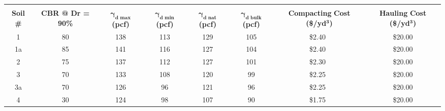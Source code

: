 \documentclass{article}
\begin{document}
\begin{center}
    \begin{tabular}{|c|c|c|c|c|c|c|c|}
        \hline
        &&&&&&&\\
        \textbf{Soil \#} & \textbf{CBR @ Dr = 90\%} &\shortstack[c]{\textbf{$\bm{\gamma_{d\text{ max}}}$}\\\textbf{(pcf)}} & \shortstack[c]{\textbf{$\bm{\gamma_{d\text{ min}}}$}\\\textbf{(pcf)}} & \shortstack[c]{\textbf{$\bm{\gamma_{d\text{ nat}}}$}\\\textbf{(pcf)}} & \shortstack[c]{\textbf{$\bm{\gamma_{d\text{ bulk}}}$}\\\textbf{(pcf)}} & \shortstack[c]{\textbf{Compacting}\\\textbf{Cost (\$/yd$\bm{^3}$)}} & \shortstack[c]{\textbf{Hauling}\\\textbf{Cost (\$/yd$\bm{^3}$)}} \\\hline\hline
        1                     & 80              & 138                   & 113                       & 129                                      & 105                    & \$2.40~                      & ~\$20.00~                 \\ 
        \hline
        1a                    & 85              & 141                   & 116                       & 127                                      & 104                    & \$2.40~                      & ~\$20.00~                 \\ 
        \hline
        2                     & 75              & 137                   & 112                       & 127                                      & 101                    & \$2.30~                      & ~\$20.00~                 \\ 
        \hline
        3 & 70              & 133                   & 108                       & 120                                      & 99                     & \$2.25~                      & ~\$20.00~                 \\ 
        \hline
        3a                    & 70              & 126                   & 96                        & 121                                      & 96                     & \$2.25~                      & ~\$20.00~                 \\ 
        \hline
        4                     & 30              & 124                   & 98                        & 107                                      & 90                     & \$1.75~                      & ~\$20.00~                 \\ 

\end{tabular}
\end{center}
\end{document}
